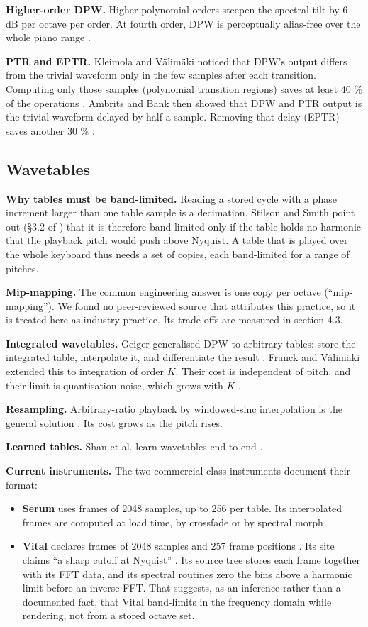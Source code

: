 \documentclass[conference]{IEEEtran}
\begin{document}
\textbf{Higher-order DPW.} Higher polynomial orders steepen the spectral tilt by 6 dB per octave per order. At fourth order, DPW is perceptually alias-free over the whole piano range \cite{r39}.

\textbf{PTR and EPTR.} Kleimola and Välimäki noticed that DPW's output differs from the trivial waveform only in the few samples after each transition. Computing only those samples (polynomial transition regions) saves at least 40 \% of the operations \cite{r19}. Ambrits and Bank then showed that DPW and PTR output is the trivial waveform delayed by half a sample. Removing that delay (EPTR) saves another 30 \% \cite{r1}.

\setcounter{subsection}{3}
\subsection{Wavetables}
\textbf{Why tables must be band-limited.} Reading a stored cycle with a phase increment larger than one table sample is a decimation. Stilson and Smith point out (§3.2 of \cite{r32}) that it is therefore band-limited only if the table holds no harmonic that the playback pitch would push above Nyquist. A table that is played over the whole keyboard thus needs a set of copies, each band-limited for a range of pitches.

\textbf{Mip-mapping.} The common engineering answer is one copy per octave (``mip-mapping''). We found no peer-reviewed source that attributes this practice, so it is treated here as industry practice. Its trade-offs are measured in section 4.3.

\textbf{Integrated wavetables.} Geiger generalised DPW to arbitrary tables: store the integrated table, interpolate it, and differentiate the result \cite{r14}. Franck and Välimäki extended this to integration of order $K$. Their cost is independent of pitch, and their limit is quantisation noise, which grows with $K$ \cite{r13}.

\textbf{Resampling.} Arbitrary-ratio playback by windowed-sinc interpolation is the general solution \cite{r31}. Its cost grows as the pitch rises.

\textbf{Learned tables.} Shan et al. learn wavetables end to end \cite{r29}.

\textbf{Current instruments.} The two commercial-class instruments document their format:

\begin{itemize}
\item \textbf{Serum} uses frames of 2048 samples, up to 256 per table. Its interpolated frames are computed at load time, by crossfade or by spectral morph \cite{S3}.
\item \textbf{Vital} declares frames of 2048 samples and 257 frame positions \cite{S1}. Its site claims ``a sharp cutoff at Nyquist'' \cite{S2}. Its source tree stores each frame together with its FFT data, and its spectral routines zero the bins above a harmonic limit before an inverse FFT. That suggests, as an inference rather than a documented fact, that Vital band-limits in the frequency domain while rendering, not from a stored octave set.
\end{itemize}
\end{document}
